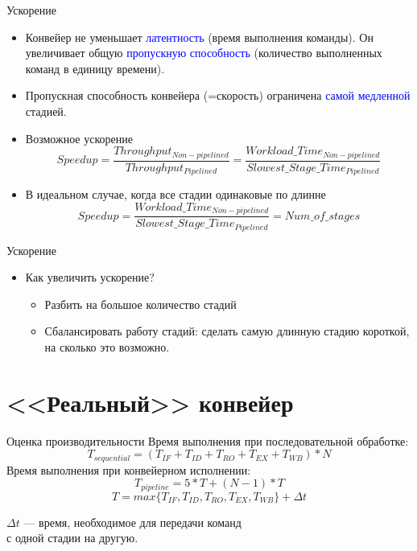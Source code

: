 \begin{frame}{Ускорение}
\begin{itemize}
    \item Конвейер не уменьшает \textcolor{blue}{латентность} (время выполнения команды). Он увеличивает общую \textcolor{blue}{пропускную способность} (количество выполненных команд в единицу времени).\pause
    \item Пропускная способность конвейера (=скорость) ограничена \textcolor{blue}{самой медленной} стадией.\pause
    \item Возможное ускорение
    \begin{displaymath}
    Speedup = \frac{Throughput_{Non-pipelined}}{Throughput_{Pipelined}} = \frac{Workload\_Time_{Non-pipelined}}{Slowest\_Stage\_Time_{Pipelined}}
    \end{displaymath}\pause
    \item В идеальном случае, когда все стадии одинаковые по длинне
    \begin{displaymath}
    Speedup = \frac{Workload\_Time_{Non-pipelined}}{Slowest\_Stage\_Time_{Pipelined}} = Num\_of\_stages
    \end{displaymath}
\end{itemize}
\end{frame}

\begin{frame}{Ускорение}
\begin{itemize}
    \item Как увеличить ускорение?\pause
    \begin{itemize}
        \item Разбить на большое количество стадий\pause
        \item Сбалансировать работу стадий: сделать самую длинную стадию короткой, на сколько это возможно.
    \end{itemize}
\end{itemize}
\end{frame}

\section{<<Реальный>> конвейер}

\begin{frame}{Оценка производительности}
Время выполнения при последовательной обработке:
\begin{displaymath}
T_{sequential} = (T_{IF} + T_{ID} + T_{RO} + T_{EX} + T_{WB}) * N
\end{displaymath}
\vfill\pause
Время выполнения при конвейерном исполнении:
\begin{displaymath}
T_{pipeline} = 5 * T + (N - 1) * T
\end{displaymath}
\begin{displaymath}
T = max \{T_{IF}, T_{ID}, T_{RO}, T_{EX}, T_{WB}\} + \Delta t
\end{displaymath}
\begin{center}
$\Delta t$ --- время, необходимое для передачи команд\\с одной стадии на другую.
\end{center}
\end{frame}

